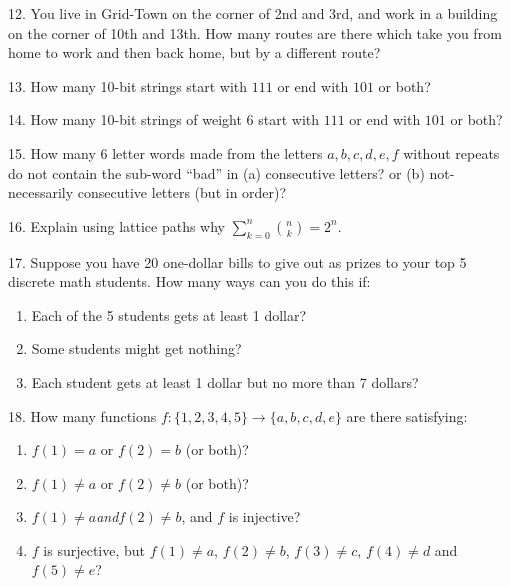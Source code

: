 \documentclass[10pt,]{book}
\theoremstyle{plain}
\theoremstyle{definition}
\theoremstyle{definition}
\theoremstyle{definition}
\numberwithin{equation}{section}
\begin{document}
\begin{exerciselist}
\par\smallskip
\item[12.]\hypertarget{exercise-113}{}
            You live in Grid-Town on the corner of 2nd and 3rd, and work in a building on the corner of 10th and 13th. How many routes are there which take you from home to work and then back home, but by a different route?
\par\smallskip
\item[13.]\hypertarget{exercise-114}{}
            How many 10-bit strings start with \(111\) or end with \(101\) or both?
\par\smallskip
\item[14.]\hypertarget{exercise-115}{}
            How many 10-bit strings of weight 6 start with \(111\) or end with \(101\) or both?
\par\smallskip
\item[15.]\hypertarget{exercise-116}{}
            How many 6 letter words made from the letters \(a,b,c,d,e,f\) without repeats do not contain the sub-word ``bad'' in (a) consecutive letters? or (b) not-necessarily consecutive letters (but in order)?
\par\smallskip
\item[16.]\hypertarget{exercise-117}{}
            Explain using lattice paths why \(\sum_{k=0}^n {n \choose k} = 2^n\).
\par\smallskip
\item[17.]\hypertarget{exercise-118}{}
            Suppose you have 20 one-dollar bills to give out as prizes to your top 5 discrete math students. How many ways can you do this if:
          \leavevmode%
\begin{enumerate}[label=(\alph*)]
\item\hypertarget{li-747}{}
                Each of the 5 students gets at least 1 dollar?
\item\hypertarget{li-748}{}
                Some students might get nothing?
\item\hypertarget{li-749}{}
                Each student gets at least 1 dollar but no more than 7 dollars?
\end{enumerate}

\par\smallskip
\item[18.]\hypertarget{exercise-119}{}
            How many functions \(f: \{1,2,3,4,5\} \to \{a,b,c,d,e\}\) are there satisfying:
          \leavevmode%
\begin{enumerate}[label=(\alph*)]
\item\hypertarget{li-753}{}\(f(1) = a\) or \(f(2) = b\) (or both)?%
\item\hypertarget{li-754}{}\(f(1) \ne a\) or \(f(2) \ne b\) (or both)?%
\item\hypertarget{li-755}{}\(f(1) \ne a\)\emph{and}\(f(2) \ne b\), and \(f\) is injective?%
\item\hypertarget{li-756}{}
                \(f\) is surjective, but \(f(1) \ne a\), \(f(2) \ne b\), \(f(3) \ne c\), \(f(4) \ne d\) and \(f(5) \ne e\)?
\end{enumerate}


\end{exerciselist}
\end{document}
